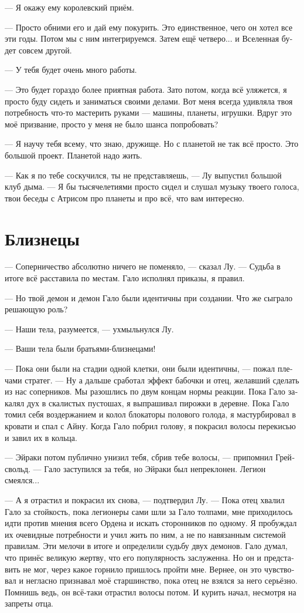 \documentclass[a4paper,12pt,fleqn]{book}\usepackage{polyglossia}\setdefaultlanguage[babelshorthands=true]{russian}\setotherlanguage{english}\defaultfontfeatures{Ligatures=TeX,Mapping=tex-text}\usepackage{xcolor}\newcommand{\ml}[3]{#2}
\begin{document}
{--- Я окажу ему королевский приём.

--- Просто обними его и дай ему покурить.
Это единственное, чего он хотел все эти годы.
Потом мы с ним интегрируемся.
Затем ещё четверо... и Вселенная будет совсем другой.

--- У тебя будет очень много работы.

--- Это будет гораздо более приятная работа.
Зато потом, когда всё уляжется, я просто буду сидеть и заниматься своими делами.
Вот меня всегда удивляла твоя потребность что-то мастерить руками --- машины, планеты, игрушки.
Вдруг это моё призвание, просто у меня не было шанса попробовать?

--- Я научу тебя всему, что знаю, дружище.
Но с планетой не так всё просто.
Это большой проект.
Планетой надо жить.

--- Как я по тебе соскучился, ты не представляешь, --- Лу выпустил большой клуб дыма.
--- Я бы тысячелетиями просто сидел и слушал музыку твоего голоса, твои беседы с Атрисом про планеты и про всё, что вам интересно.

\section{Близнецы}

--- Соперничество абсолютно ничего не поменяло, --- сказал Лу.
--- Судьба в итоге всё расставила по местам.
Гало исполнял приказы, я правил.

--- Но твой демон и демон Гало были идентичны при создании.
Что же сыграло решающую роль?

--- Наши тела, разумеется, --- ухмыльнулся Лу.

--- Ваши тела были братьями-близнецами!

--- Пока они были на стадии одной клетки, они были идентичны, --- пожал плечами стратег.
--- Ну а дальше сработал эффект бабочки и отец, желавший сделать из нас соперников.
Мы разошлись по двум концам нормы реакции.
Пока Гало закалял дух в скалистых пустошах, я выпрашивал пирожки в деревне.
Пока Гало томил себя воздержанием и колол блокаторы полового голода, я мастурбировал в кровати и спал с Айну.
Когда Гало побрил голову, я покрасил волосы перекисью и завил их в кольца.

--- Эйраки потом публично унизил тебя, сбрив тебе волосы, --- припомнил Грейсвольд.
--- Гало заступился за тебя, но Эйраки был непреклонен.
Легион смеялся...

--- А я отрастил и покрасил их снова, --- подтвердил Лу.
--- Пока отец хвалил Гало за стойкость, пока легионеры сами шли за Гало толпами, мне приходилось идти против мнения всего Ордена и искать сторонников по одному.
Я пробуждал их очевидные потребности и учил жить по ним, а не по навязанным системой правилам.
Эти мелочи в итоге и определили судьбу двух демонов.
Гало думал, что принёс великую жертву, что его популярность заслуженна.
Но он и представить не мог, через какое горнило пришлось пройти мне.
Вернее, он это чувствовал и негласно признавал моё старшинство, пока отец не взялся за него серьёзно.
Помнишь ведь, он всё-таки отрастил волосы потом.
И курить начал, несмотря на запреты отца.

}
\end{document}
